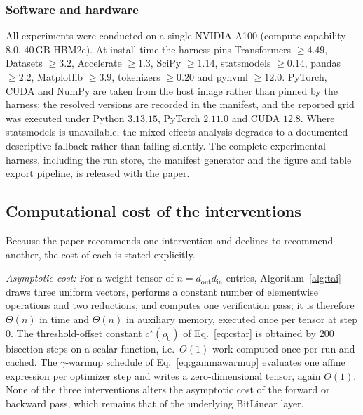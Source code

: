 \documentclass[final,5p,times,twocolumn]{elsarticle}
\theoremstyle{remark}
\newcommand{\rhoz}{\rho_{0}}
\begin{document}
\subsubsection{Software and hardware}

All experiments were conducted on a single NVIDIA A100 (compute capability
$8.0$, $40$\,GB HBM2e). At install time the harness pins
Transformers $\geq 4.49$, Datasets $\geq 3.2$,
Accelerate $\geq 1.3$, SciPy $\geq 1.14$, statsmodels $\geq 0.14$,
pandas $\geq 2.2$, Matplotlib $\geq 3.9$, tokenizers $\geq 0.20$ and
pynvml $\geq 12.0$. PyTorch, CUDA and NumPy are taken
from the host image rather than pinned by the harness; the resolved versions
are recorded in the manifest, and the reported grid was executed under
Python $3.13.15$, PyTorch $2.11.0$ and CUDA $12.8$. Where statsmodels is
unavailable, the mixed-effects analysis degrades to a documented descriptive
fallback rather than failing silently. The complete experimental harness,
including the run store, the manifest generator and the figure and table export
pipeline, is released with the paper.

\subsection{Computational cost of the interventions}
\label{sec:complexity}

Because the paper recommends one intervention and declines to recommend
another, the cost of each is stated explicitly.

\textit{Asymptotic cost:} For a weight tensor of $n = d_{\mathrm{out}}
d_{\mathrm{in}}$ entries, Algorithm~\ref{alg:tai} draws three uniform vectors,
performs a constant number of elementwise operations and two reductions, and
computes one verification pass; it is therefore $\Theta(n)$ in time and
$\Theta(n)$ in auxiliary memory, executed once per tensor at step $0$. The
threshold-offset constant $c^{\star}(\rhoz)$ of Eq.~\eqref{eq:cstar} is
obtained by $200$ bisection steps on a scalar function, i.e.\ $O(1)$ work
computed once per run and cached. The $\gamma$-warmup schedule of
Eq.~\eqref{eq:gammawarmup} evaluates one affine expression per optimizer step
and writes a zero-dimensional tensor, again $O(1)$. None of the three
interventions alters the asymptotic cost of the forward or backward pass, which
remains that of the underlying BitLinear layer.
\end{document}
